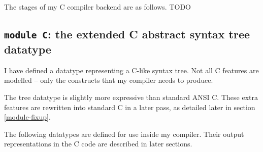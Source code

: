 \documentclass[12pt,a4paper,twoside,openright]{report}
\begin{document}
The stages of my C compiler backend are as follows. TODO

\subsection{\texttt{module C}: the extended C abstract syntax tree datatype}

I have defined a datatype representing a C-like syntax tree. Not all C features
are modelled -- only the constructs that my compiler needs to produce.

The tree datatype is slightly more expressive than standard ANSI C. These extra
features are rewritten into standard C in a later pass, as detailed later in
section \ref{module-fixup}.

The following datatypes are defined for use inside my compiler. Their output representations in the C code are described in later sections.
\end{document}
